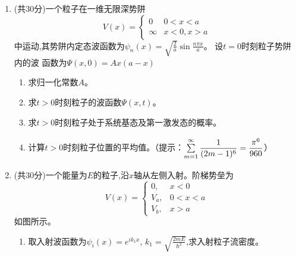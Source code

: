 

\begin{enumerate}
	\item
	(共30分)一个粒子在一维无限深势阱
	$$
	V(x)=\left\{\begin{array}{cc}
		0 & 0<x<a \\
		\infty & x<0, x>a
	\end{array}\right.
	$$
	中运动,其势阱内定态波函数为$\psi_{n}(x)=\sqrt{\frac{2}{a}} \sin \frac{n \pi x}{a}$。
	设$ t=0 $时刻粒子势阱内的波
	函数为$\Psi(x, 0)=A x(a-x)$
	\begin{enumerate}
		\item
		求归一化常数$ A $。
		
		\item 
		求$ t>0 $时刻粒子的波函数$ \Psi(x,t) $。
		
		\item 
		求$ t>0 $时刻粒子处于系统基态及第一激发态的概率。
		
		\item 
		计算$ t>0 $时刻粒子位置的平均值。（提示：$\sum\limits_{\mathstrut m=1}^{\mathstrut \infty} \dfrac{1}{(2 m-1)^{6}}=\dfrac{\pi^{6}}{960}$）
	
		
		
		
		
		
		
	\end{enumerate}
	
	
\item 
(共$ 30 $分)一个能量为$ E $的粒子,沿$ x $轴从左侧入射。阶梯势垒为
$$
V(x)=\left\{\begin{array}{ll}
	0, & x<0 \\
	V_{a}, & 0<x<a \\
	V_{b}, & x>a
\end{array}\right.
$$
如图所示。
\begin{figure}[h!]
	\centering
	
\end{figure}
\begin{enumerate}
	\item
	取入射波函数为$\psi_{i}(x)=e^{i k_{1} x}$,  $k_{1}=\sqrt{\frac{2 m E}{\hbar^{2}}}$,求入射粒子流密度。
	

\end{enumerate}
\end{enumerate}
